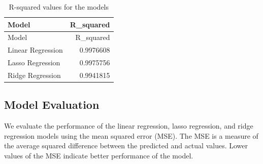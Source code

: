\documentclass[
]{article}
\newenvironment{Shaded}{\begin{snugshade}}{\end{snugshade}}
\newcommand{\AttributeTok}[1]{\textcolor[rgb]{0.13,0.29,0.53}{#1}}
\newcommand{\DecValTok}[1]{\textcolor[rgb]{0.00,0.00,0.81}{#1}}
\newcommand{\FunctionTok}[1]{\textcolor[rgb]{0.13,0.29,0.53}{\textbf{#1}}}
\newcommand{\NormalTok}[1]{#1}
\newcommand{\OtherTok}[1]{\textcolor[rgb]{0.56,0.35,0.01}{#1}}
\newcommand{\SpecialCharTok}[1]{\textcolor[rgb]{0.81,0.36,0.00}{\textbf{#1}}}
\newcommand{\StringTok}[1]{\textcolor[rgb]{0.31,0.60,0.02}{#1}}
\begin{document}
\begin{longtable}[]{@{}lr@{}}
\caption{R-squared values for the models}\tabularnewline
\toprule\noalign{}
Model & R\_squared \\
\midrule\noalign{}
\endfirsthead
\toprule\noalign{}
Model & R\_squared \\
\midrule\noalign{}
\endhead
\bottomrule\noalign{}
\endlastfoot
Linear Regression & 0.9976608 \\
Lasso Regression & 0.9975756 \\
Ridge Regression & 0.9941815 \\
\end{longtable}

\hypertarget{model-evaluation}{%
\subsection{Model Evaluation}\label{model-evaluation}}

We evaluate the performance of the linear regression, lasso regression,
and ridge regression models using the mean squared error (MSE). The MSE
is a measure of the average squared difference between the predicted and
actual values. Lower values of the MSE indicate better performance of
the model.

\begin{Shaded}
\end{Shaded}
\end{document}
